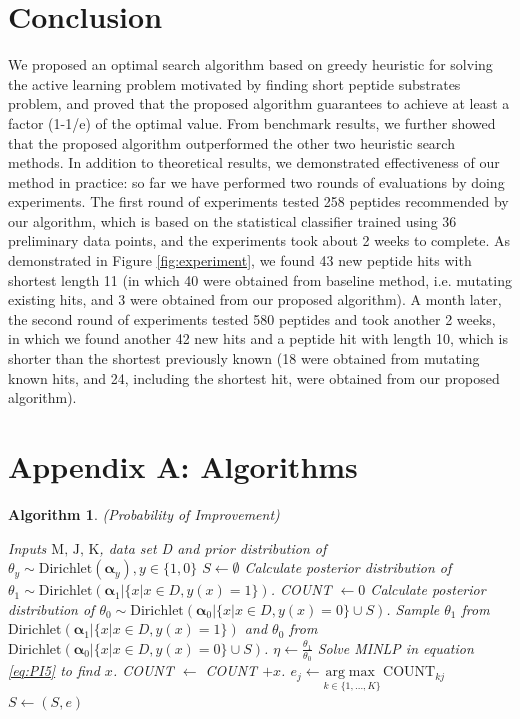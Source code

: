 \documentclass[12pt]{article}
\newtheorem{Algorithm}{Algorithm}
\begin{document}
\section{Conclusion}
We proposed an optimal search algorithm based on greedy heuristic for solving the active learning problem motivated by finding short peptide substrates problem, and proved that the proposed algorithm guarantees to achieve at least a factor (1-1/e) of the optimal value. From benchmark results, we further showed that the proposed algorithm outperformed the other two heuristic search methods. In addition to theoretical results, we demonstrated effectiveness of our method in practice: so far we have performed two rounds of evaluations by doing experiments. The first round of experiments tested 258 peptides recommended by our algorithm, which is based on the statistical classifier trained using 36 preliminary data points, and the experiments took about 2 weeks to complete. As demonstrated in Figure \ref{fig:experiment}, we found 43 new peptide hits with shortest length 11 (in which 40 were obtained from baseline method, i.e. mutating existing hits, and 3 were obtained from our proposed algorithm). A month later, the second round of experiments tested 580 peptides and took another 2 weeks, in which we found another 42 new hits and a peptide hit with length 10, which is shorter than the shortest previously known (18 were obtained from mutating known hits, and 24, including the shortest hit, were obtained from our proposed algorithm). 

\section*{Appendix A: Algorithms}

\begin{Algorithm}(Probability of Improvement) \label{algo1}
\begin{algorithmic}[1]
\REQUIRE Inputs $\text{M, J, K}$, data set D and prior distribution of $\theta_y \sim \text{Dirichlet} (\boldsymbol \alpha_y), y \in \{1,0\}$
\STATE $S \leftarrow \emptyset $
\STATE Calculate posterior distribution of $\theta_1 \sim \text{Dirichlet} (\boldsymbol \alpha_1|\{x|x \in D,y(x)=1\})$.
\STATE COUNT $\leftarrow 0$
\STATE Calculate posterior distribution of $\theta_0 \sim \text{Dirichlet} (\boldsymbol \alpha_0|\{x|x \in D,y(x)=0\} \cup S)$.
\LOOP 
\STATE Sample $\theta_1$ from $\text{Dirichlet} (\boldsymbol \alpha_1|\{x|x \in D,y(x)=1\})$ and $\theta_0$ from $\text{Dirichlet} (\boldsymbol \alpha_0|\{x|x \in D,y(x)=0\} \cup S)$.
\STATE $\eta \leftarrow \frac{\theta_1}{\theta_0}$
\STATE Solve MINLP in equation \eqref{eq:PI5} to find $x$.
\STATE COUNT $\leftarrow$ COUNT $+ x$.
\ENDLOOP
{}
\STATE $e_j \leftarrow \underset{k \in \{1,\ldots,K\}}{\mathrm{arg}\max} \, \text{COUNT}_{kj}$
\ENDFOR
\STATE $S \leftarrow (S, e)$
\ENDFOR
\end{algorithmic}
\end{Algorithm}
\end{document}
